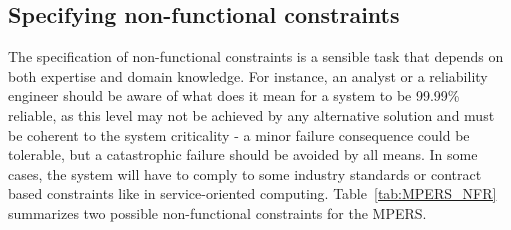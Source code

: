 

%
%
%
%

\subsection{Specifying non-functional constraints}

The specification of non-functional constraints is a sensible task that depends on both expertise and domain knowledge. For instance, an analyst or a reliability engineer should be aware of what does it mean for a system to be 99.99\% reliable, as this level may not be achieved by any alternative solution and must be coherent to the system criticality - a minor failure consequence could be tolerable, but a catastrophic failure should be avoided by all means. In some cases, the system will have to comply to some industry standards or contract based constraints like in service-oriented computing. Table~\ref{tab:MPERS_NFR} summarizes two possible non-functional constraints for the MPERS.
\medskip

